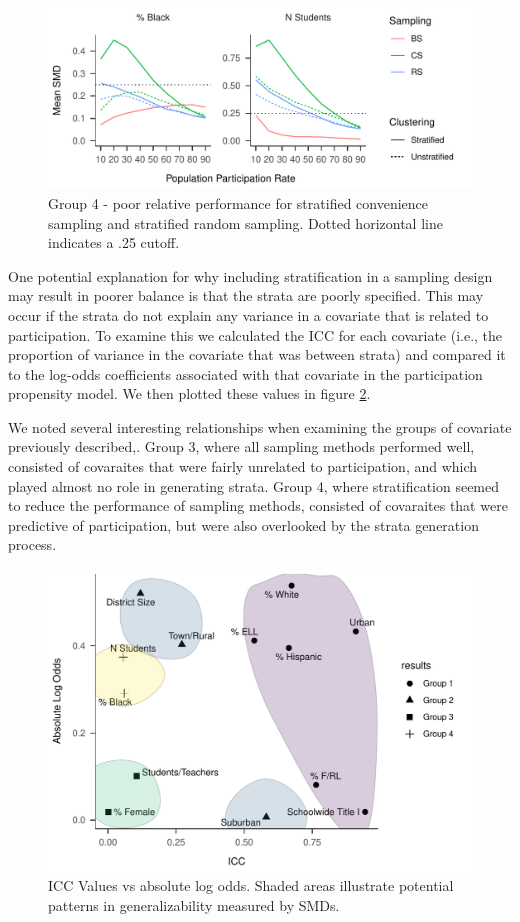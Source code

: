\documentclass[man,floatsintext]{apa6}
\begin{document}
\begin{figure}
\centering
\includegraphics{GenSamp-Paper_files/figure-latex/fig-SMD-by-Var-bad-1.pdf}
\caption{\label{fig:fig-SMD-by-Var-bad}Group 4 - poor relative performance for stratified convenience sampling and stratified random sampling. Dotted horizontal line indicates a .25 cutoff.}
\end{figure}

One potential explanation for why including stratification in a sampling design may result in poorer balance is that the strata are poorly specified. This may occur if the strata do not explain any variance in a covariate that is related to participation. To examine this we calculated the ICC for each covariate (i.e., the proportion of variance in the covariate that was between strata) and compared it to the log-odds coefficients associated with that covariate in the participation propensity model. We then plotted these values in figure \ref{fig:fig-ICCvsCoef}.

We noted several interesting relationships when examining the groups of covariate previously described,. Group 3, where all sampling methods performed well, consisted of covaraites that were fairly unrelated to participation, and which played almost no role in generating strata. Group 4, where stratification seemed to reduce the performance of sampling methods, consisted of covaraites that were predictive of participation, but were also overlooked by the strata generation process.

\begin{figure}
\centering
\includegraphics{GenSamp-Paper_files/figure-latex/fig-ICCvsCoef-1.pdf}
\caption{\label{fig:fig-ICCvsCoef}ICC Values vs absolute log odds. Shaded areas illustrate potential patterns in generalizability measured by SMDs.}
\end{figure}
\end{document}
